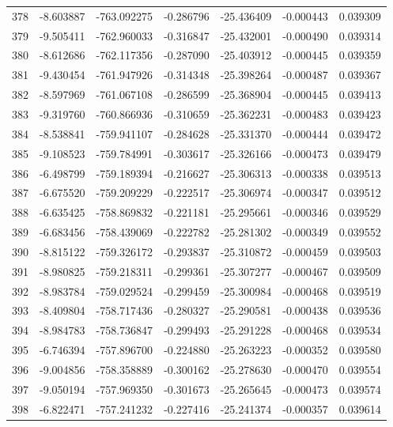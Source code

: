 \begin{tabular}{rrrrrrr}
 378 &  -8.603887 & -763.092275 & -0.286796 & -25.436409 &  -0.000443 &  0.039309 \\
 379 &  -9.505411 & -762.960033 & -0.316847 & -25.432001 &  -0.000490 &  0.039314 \\
 380 &  -8.612686 & -762.117356 & -0.287090 & -25.403912 &  -0.000445 &  0.039359 \\
 381 &  -9.430454 & -761.947926 & -0.314348 & -25.398264 &  -0.000487 &  0.039367 \\
 382 &  -8.597969 & -761.067108 & -0.286599 & -25.368904 &  -0.000445 &  0.039413 \\
 383 &  -9.319760 & -760.866936 & -0.310659 & -25.362231 &  -0.000483 &  0.039423 \\
 384 &  -8.538841 & -759.941107 & -0.284628 & -25.331370 &  -0.000444 &  0.039472 \\
 385 &  -9.108523 & -759.784991 & -0.303617 & -25.326166 &  -0.000473 &  0.039479 \\
 386 &  -6.498799 & -759.189394 & -0.216627 & -25.306313 &  -0.000338 &  0.039513 \\
 387 &  -6.675520 & -759.209229 & -0.222517 & -25.306974 &  -0.000347 &  0.039512 \\
 388 &  -6.635425 & -758.869832 & -0.221181 & -25.295661 &  -0.000346 &  0.039529 \\
 389 &  -6.683456 & -758.439069 & -0.222782 & -25.281302 &  -0.000349 &  0.039552 \\
 390 &  -8.815122 & -759.326172 & -0.293837 & -25.310872 &  -0.000459 &  0.039503 \\
 391 &  -8.980825 & -759.218311 & -0.299361 & -25.307277 &  -0.000467 &  0.039509 \\
 392 &  -8.983784 & -759.029524 & -0.299459 & -25.300984 &  -0.000468 &  0.039519 \\
 393 &  -8.409804 & -758.717436 & -0.280327 & -25.290581 &  -0.000438 &  0.039536 \\
 394 &  -8.984783 & -758.736847 & -0.299493 & -25.291228 &  -0.000468 &  0.039534 \\
 395 &  -6.746394 & -757.896700 & -0.224880 & -25.263223 &  -0.000352 &  0.039580 \\
 396 &  -9.004856 & -758.358889 & -0.300162 & -25.278630 &  -0.000470 &  0.039554 \\
 397 &  -9.050194 & -757.969350 & -0.301673 & -25.265645 &  -0.000473 &  0.039574 \\
 398 &  -6.822471 & -757.241232 & -0.227416 & -25.241374 &  -0.000357 &  0.039614 \\

\end{tabular}
